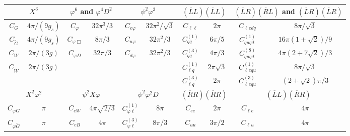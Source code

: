 \documentclass[
aps,
prd,
10pt,
twocolumn,
oneside,
preprintnumbers,
superscriptaddress,
amsmath,
amssymb,
nofootinbib,
flushbottom]{revtex4-2}
\begin{document}
\begin{table}[h!t!b]
\renewcommand{\arraystretch}{1.5}
    \centering
    \begin{tabular}{c|c|c|c|c|c|c|c|c|c}
    \toprule
    \toprule
    \multicolumn{2}{c|}{{\boldmath$X^3$}} & \multicolumn{2}{c|}{{\boldmath$\varphi^6$} and {\boldmath$\varphi^4D^2$}} & \multicolumn{2}{c|}{{\boldmath$   \psi^2\varphi^3$}} & \multicolumn{2}{c|}{{\boldmath$(\overline{L}L)(\overline{L}L)$}} & \multicolumn{2}{c}{{\boldmath$(\overline{L}R)(\overline{R}L)$} and {\boldmath$(\overline{L}R)(\overline{L}R)$}}\\
    \hline
    $C_G$ & $4\pi/(9g_s)$ & $C_\varphi$ & $32\pi^3/3$ & $C_{e\varphi}$ & $32\pi^2/\sqrt{3}$ & $C_{\ell\ell}$ & $2\pi$ & $C_{\ell e dq}$ & $8\pi/\sqrt{3}$ \\
    
    $C_{\widetilde G}$ & $4\pi/(9g_s)$ & $C_{\varphi\Box}$ & $8\pi/3$ & $C_{u\varphi}$ & $32\pi^2/3$ & $C_{qq}^{(1)}$ & $6\pi/5$ & $C_{quqd}^{(1)}$ & $16\pi(1+\sqrt{2})/9$\\ 
        
    $C_W$ & $2\pi/(3g)$ &$C_{\varphi D}$ & $32\pi/3$ & $C_{d\varphi}$ & $32\pi^2/3$ & $C_{qq}^{(3)}$ & $4\pi/3$ & $C_{quqd}^{(8)}$ & $4\pi(2+7\sqrt{2})/3$\\
    
    $C_{\widetilde W}$ & $2\pi/(3g)$ & & & & & $C_{\ell q}^{(1)}$ & $2\pi\sqrt{3}$ & $C_{\ell equ}^{(1)}$ & $8\pi/\sqrt{3}$ \\

    &&&&&&  $C_{\ell q}^{(3)}$ & $2\pi$ & $C_{\ell e qu}^{(3)}$ & $(2+\sqrt{2})\pi/3$   \\
    
         \midrule
         \midrule
         \multicolumn{2}{c|}{{\boldmath$X^2\varphi^2$}} & \multicolumn{2}{c|}{{\boldmath$\psi^2 X \varphi$}} & \multicolumn{2}{c|}{{\boldmath$\psi^2\varphi^2D$}} & \multicolumn{2}{c|}{{\boldmath$(\overline{R}R)(\overline{R}R)$}} & \multicolumn{2}{c}{{\boldmath$(\overline{L}L)(\overline{R}R)$}}\\
         \hline
         $C_{\varphi G}$ & $\pi$ & $C_{eW}$ & $4\pi\sqrt{2/3}$ & $C_{\varphi \ell}^{(1)}$ & $8\pi$ & $C_{ee}$ & $2\pi$ & $C_{\ell e}$ & $4\pi$ \\
         
         $C_{\varphi \widetilde G}$ & $\pi$ & $C_{eB}$ & $4\pi$ & $C_{\varphi \ell}^{(3)}$ & $8\pi/3$ & $C_{uu}$ & $3\pi/2$ & $C_{\ell u}$ & $4\pi$\\
         

\end{tabular}
\end{table}
\end{document}
